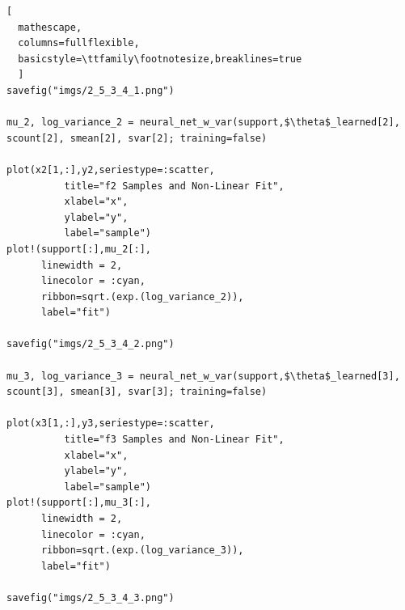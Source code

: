 \documentclass[12pt,letter]{article}
\begin{document}
\begin{enumerate}
\begin{lstlisting}[
  mathescape,
  columns=fullflexible,
  basicstyle=\ttfamily\footnotesize,breaklines=true
  ]
savefig("imgs/2_5_3_4_1.png")

mu_2, log_variance_2 = neural_net_w_var(support,$\theta$_learned[2], scount[2], smean[2], svar[2]; training=false)

plot(x2[1,:],y2,seriestype=:scatter,
          title="f2 Samples and Non-Linear Fit",
          xlabel="x",
          ylabel="y",
          label="sample")
plot!(support[:],mu_2[:],
      linewidth = 2,
      linecolor = :cyan,
      ribbon=sqrt.(exp.(log_variance_2)),
      label="fit")

savefig("imgs/2_5_3_4_2.png")

mu_3, log_variance_3 = neural_net_w_var(support,$\theta$_learned[3], scount[3], smean[3], svar[3]; training=false)

plot(x3[1,:],y3,seriestype=:scatter,
          title="f3 Samples and Non-Linear Fit",
          xlabel="x",
          ylabel="y",
          label="sample")
plot!(support[:],mu_3[:],
      linewidth = 2,
      linecolor = :cyan,
      ribbon=sqrt.(exp.(log_variance_3)),
      label="fit")

savefig("imgs/2_5_3_4_3.png")
\end{lstlisting}


\end{enumerate}
\end{document}
